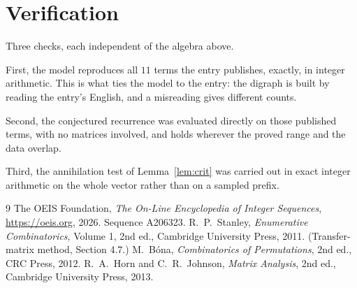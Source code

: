 \documentclass[11pt,a4paper]{article}
\theoremstyle{plain}
\theoremstyle{definition}
\begin{document}
\section{Verification}

Three checks, each independent of the algebra above.

First, the model reproduces all $11$ terms the entry publishes, exactly, in integer
arithmetic. This is what ties the model to the entry: the digraph is built by reading the
entry's English, and a misreading gives different counts.

Second, the conjectured recurrence was evaluated directly on those published terms, with no
matrices involved, and holds wherever the proved range and the data overlap.

Third, the annihilation test of Lemma~\ref{lem:crit} was carried out in exact integer
arithmetic on the whole vector rather than on a sampled prefix.

\begin{thebibliography}{9}
 The OEIS Foundation, \emph{The On-Line Encyclopedia of Integer
Sequences}, \url{https://oeis.org}, 2026. Sequence A206323.
 R.~P.~Stanley, \emph{Enumerative Combinatorics}, Volume 1, 2nd ed.,
Cambridge University Press, 2011. (Transfer-matrix method, Section 4.7.)
 M.~B\'ona, \emph{Combinatorics of Permutations}, 2nd ed., CRC
Press, 2012.
 R.~A.~Horn and C.~R.~Johnson, \emph{Matrix Analysis}, 2nd ed., Cambridge
University Press, 2013.
\end{thebibliography}
\end{document}
